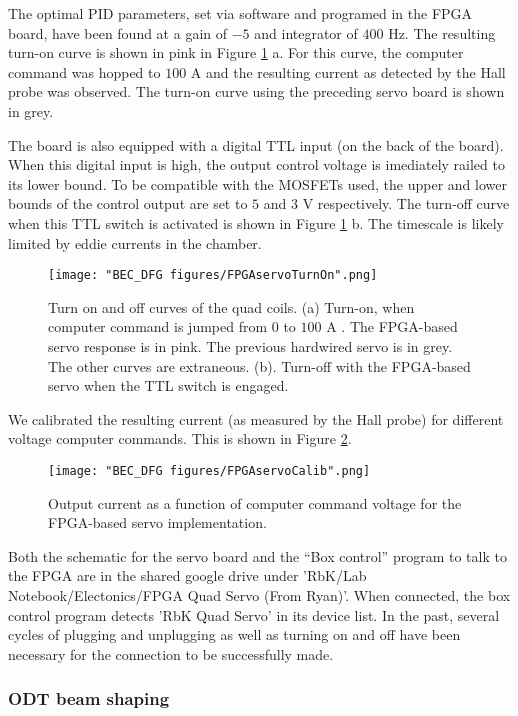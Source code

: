 The optimal PID parameters, set via software and programed in the FPGA board, have been found at a gain of $-5$ and integrator of $400$ Hz. The resulting turn-on curve is shown in pink in Figure \ref{fig:FPGAservoTurnOn} a. For this curve, the computer command was hopped to $100$ A and the resulting current as detected by the Hall probe was observed. The turn-on curve using the preceding servo board is shown in grey. 

The board is also equipped with a digital TTL input (on the back of the board). When this digital input is high, the output control voltage is imediately railed to its lower bound. To be compatible with the MOSFETs used, the upper and lower bounds of the control output are set to $5$ and $3$ V respectively. The turn-off curve when this TTL switch is activated is shown in  Figure \ref{fig:FPGAservoTurnOn} b. The timescale is likely limited by eddie currents in the chamber. 

\begin{figure}
	\texttt{[image: "BEC\_DFG figures/FPGAservoTurnOn".png]}
\caption[Turn on and off curves of the quad coils]{Turn on and off curves of the quad coils. (a) Turn-on, when computer command is jumped from $0$ to $100$ A . The FPGA-based servo response is in pink. The previous hardwired servo is in grey. The other curves are extraneous. (b). Turn-off with the FPGA-based servo when the TTL switch is engaged.}
\label{fig:FPGAservoTurnOn}
\end{figure}

We calibrated the resulting current (as measured by the Hall probe) for different voltage computer commands. This is shown in Figure \ref{fig:FPGAservoCalib}. 
\begin{figure}
	\texttt{[image: "BEC\_DFG figures/FPGAservoCalib".png]}
\caption[Output current as a function of computer command voltage]{Output current as a function of computer command voltage for the FPGA-based servo implementation. }
\label{fig:FPGAservoCalib}
\end{figure}

Both the schematic for the servo board and the “Box control” program to talk to the FPGA are in the shared google drive under 'RbK/Lab Notebook/Electonics/FPGA Quad Servo (From Ryan)'. When connected, the box control program detects 'RbK Quad Servo' in its device list. In the past, several cycles of plugging and unplugging as well as turning on and off have been necessary for the connection to be successfully made.
\subsubsection{ODT beam shaping}\label{sec:ODTbeamShape}

